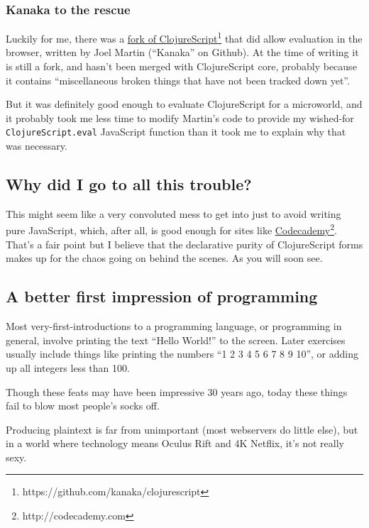 \subsubsection{Kanaka to the rescue}

Luckily for me, there was a \href{https://github.com/kanaka/clojurescript}{fork of ClojureScript}\footnote{https://github.com/kanaka/clojurescript} that did allow evaluation in the browser, written by Joel Martin
(``Kanaka'' on Github). At the time of writing it is still a fork, and
hasn't been merged with ClojureScript core, probably because it contains
``miscellaneous broken things that have not been tracked down yet''.

But it was definitely good enough to evaluate ClojureScript for a
microworld, and it probably took me less time to modify Martin's code to
provide my wished-for \texttt{ClojureScript.eval} JavaScript function
than it took me to explain why that was necessary.

\subsection{Why did I go to all this trouble?}

This might seem like a very convoluted mess to get into just to avoid
writing pure JavaScript, which, after all, is good enough for sites like
\href{http://codecademy.com}{Codecademy}\footnote{http://codecademy.com}. That's a fair point but I believe that the declarative
purity of ClojureScript forms makes up for the chaos going on behind the
scenes. As you will soon see.

\subsection{A better first impression of programming}

Most very-first-introductions to a programming language, or programming
in general, involve printing the text ``Hello World!'' to the screen.
Later exercises usually include things like printing the numbers ``1 2 3
4 5 6 7 8 9 10'', or adding up all integers less than 100.

Though these feats may have been impressive 30 years ago, today these things fail to blow
most people's socks off.

Producing plaintext is far from unimportant (most webservers do little
else), but in a world where technology means Oculus Rift and 4K Netflix,
it's not really sexy.

